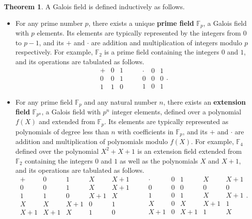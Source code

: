 \documentclass{article}
\theoremstyle{definition}
\newtheorem{theorem}{Theorem}
\newcommand{\F}{\mathbb{F}}
\begin{document}
\begin{theorem}
A Galois field is defined inductively as follows.
\begin{itemize}
\item For any prime number $ p $, there exists a unique \textbf{prime field} $ \F_p $, a Galois field with $ p $ elements. Its elements are typically represented by the integers from $ 0 $ to $ p - 1 $, and its $ + $ and $ \cdot $ are addition and multiplication of integers modulo $ p $ respectively. For example, $ \F_2 $ is a prime field containing the integers $ 0 $ and $ 1 $, and its operations are tabulated as follows.
$$
\begin{array}{c|cc}
+ & 0 & 1 \\
\hline
0 & 0 & 1 \\
1 & 1 & 0
\end{array}
\qquad
\begin{array}{c|cc}
\cdot & 0 & 1 \\
\hline
0 & 0 & 0 \\
1 & 0 & 1
\end{array}.
$$
\item For any prime field $ \F_p $ and any natural number $ n $, there exists an \textbf{extension field} $ \F_{p^n} $, a Galois field with $ p^n $ integer elements, defined over a polynomial $ f(X) $ and extended from $ \F_p $. Its elements are typically represented as polynomials of degree less than $ n $ with coefficients in $ \F_p $, and its $ + $ and $ \cdot $ are addition and multiplication of polynomials modulo $ f(X) $. For example, $ \F_4 $ defined over the polynomial $ X^2 + X + 1 $ is an extension field extended from $ \F_2 $ containing the integers $ 0 $ and $ 1 $ as well as the polynomials $ X $ and $ X + 1 $, and its operations are tabulated as follows.
$$
\begin{array}{c|cccc}
+ & 0 & 1 & X & X + 1 \\
\hline
0 & 0 & 1 & X & X + 1 \\
1 & 1 & 0 & X + 1 & X \\
X & X & X + 1 & 0 & 1 \\
X + 1 & X + 1 & X & 1 & 0
\end{array}
\qquad
\begin{array}{c|cccc}
\cdot & 0 & 1 & X & X + 1 \\
\hline
0 & 0 & 0 & 0 & 0 \\
1 & 0 & 1 & X & X + 1 \\
X & 0 & X & X + 1 & 1 \\
X + 1 & 0 & X + 1 & 1 & X
\end{array}.
$$
\end{itemize}
\end{theorem}
\end{document}

